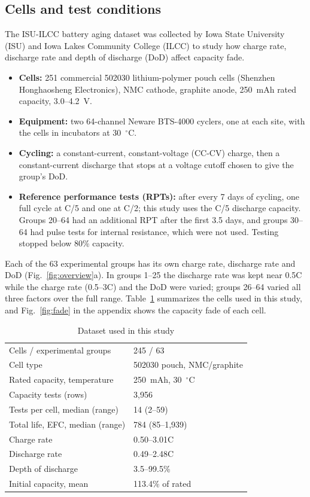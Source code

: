 \documentclass[conference]{IEEEtran}
\begin{document}
\subsection{Cells and test conditions}
The ISU-ILCC battery aging dataset \cite{thelen2023} was collected by Iowa State University (ISU) and Iowa Lakes Community College (ILCC) to study how charge rate, discharge rate and depth of discharge (DoD) affect capacity fade.
\begin{itemize}
\item \textbf{Cells:} 251 commercial 502030 lithium-polymer pouch cells (Shenzhen Honghaosheng Electronics), NMC cathode, graphite anode, 250~mAh rated capacity, 3.0--4.2~V.
\item \textbf{Equipment:} two 64-channel Neware BTS-4000 cyclers, one at each site, with the cells in incubators at 30~$^\circ$C.
\item \textbf{Cycling:} a constant-current, constant-voltage (CC-CV) charge, then a constant-current discharge that stops at a voltage cutoff chosen to give the group's DoD.
\item \textbf{Reference performance tests (RPTs):} after every 7 days of cycling, one full cycle at C/5 and one at C/2; this study uses the C/5 discharge capacity. Groups 20--64 had an additional RPT after the first 3.5 days, and groups 30--64 had pulse tests for internal resistance, which were not used. Testing stopped below 80\% capacity.
\end{itemize}

Each of the 63 experimental groups has its own charge rate, discharge rate and DoD (Fig.~\ref{fig:overview}a). In groups 1--25 the discharge rate was kept near 0.5C while the charge rate (0.5--3C) and the DoD were varied; groups 26--64 varied all three factors over the full range. Table~\ref{tab:data} summarizes the cells used in this study, and Fig.~\ref{fig:fade} in the appendix shows the capacity fade of each cell.

\begin{table}[t]
\centering
\caption{Dataset used in this study}
\label{tab:data}
\begin{tabular}{@{}ll@{}}
\toprule
Cells / experimental groups & 245 / 63 \\
Cell type & 502030 pouch, NMC/graphite \\
Rated capacity, temperature & 250~mAh, 30~$^\circ$C \\
Capacity tests (rows) & 3,956 \\
Tests per cell, median (range) & 14 (2--59) \\
Total life, EFC, median (range) & 784 (85--1,939) \\
Charge rate & 0.50--3.01C \\
Discharge rate & 0.49--2.48C \\
Depth of discharge & 3.5--99.5\% \\
Initial capacity, mean & 113.4\% of rated \\
\bottomrule
\end{tabular}
\end{table}
\end{document}
